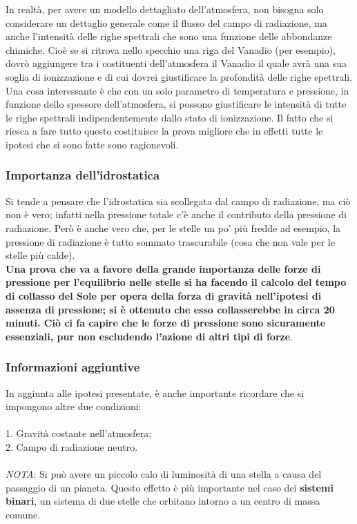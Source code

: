\documentclass[a4paper,11pt]{article}
\begin{document}
In realtà, per avere un modello dettagliato dell'atmosfera, non bisogna solo considerare un dettaglio generale come il flusso del campo di radiazione, ma anche l'intensità delle righe spettrali che sono una funzione delle abbondanze chimiche. Cioè se si ritrova nello specchio una riga del Vanadio (per esempio), dovrò aggiungere tra i costituenti dell'atmosfera il Vanadio il quale avrà una sua soglia di ionizzazione e di cui dovrei giustificare la profondità delle righe spettrali. \\
Una cosa interessante è che con un solo parametro di temperatura e pressione, in funzione dello spessore dell'atmosfera, si possono giustificare le intensità di tutte le righe spettrali indipendentemente dallo stato di ionizzazione. Il fatto che si riesca a fare tutto questo costituisce la prova migliore che in effetti tutte le ipotesi che si sono fatte sono ragionevoli.
\subsubsection{Importanza dell'idrostatica}Si tende a pensare che l'idrostatica sia scollegata dal campo di radiazione, ma ciò non è vero; infatti nella pressione totale c'è anche il contributo della pressione di radiazione. Però è anche vero che, per le stelle un po' più fredde ad esempio, la pressione di radiazione è tutto sommato trascurabile (cosa che non vale per le stelle più calde).\\ \textbf{Una prova che va a favore della grande importanza delle forze di pressione per l'equilibrio nelle stelle si ha facendo il calcolo del tempo di collasso del Sole per opera della forza di gravità nell'ipotesi di assenza di pressione; si è ottenuto che esso collasserebbe in circa 20 minuti. Ciò ci fa capire che le forze di pressione sono sicuramente essenziali, pur non escludendo l'azione di altri tipi di forze}.
\subsubsection{Informazioni aggiuntive}
In aggiunta alle ipotesi presentate, è anche importante ricordare che si impongono altre due condizioni: \\ \\ 1. Gravità costante nell'atmosfera; \\
2. Campo di radiazione neutro.
\\ \\
\textit{NOTA}: Si può avere un piccolo calo di luminosità di una stella a causa del passaggio di un pianeta. 
Questo effetto è più importante nel caso dei \textbf{sistemi binari}, un sistema di due stelle che orbitano intorno a un centro di massa comune. 
\end{document}
